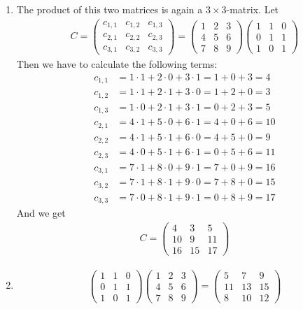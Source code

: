 \documentclass[solution]{tudexercise}
\begin{document}
\begin{enumerate}
				\item
				The product of this two matrices is again a $3 \times 3$-matrix. Let
				\begin{align*}
C = \begin{pmatrix}
c_{1, 1} & c_{1, 2} & c_{1, 3}\\
c_{2, 1} & c_{2, 2} & c_{2, 3}\\
c_{3, 1} & c_{3, 2} & c_{3, 3}
\end{pmatrix} = \begin{pmatrix}
1 & 2 & 3\\
4 & 5 & 6\\
7 & 8 & 9
\end{pmatrix}\begin{pmatrix}
1 & 1 & 0\\
0 & 1 & 1\\
1 & 0 & 1
\end{pmatrix}
				\end{align*}
				Then we have to calculate the following terms:
				\begin{align*}
c_{1, 1} &= 1 \cdot 1 + 2 \cdot 0 + 3 \cdot 1 = 1 + 0 + 3 = 4\\
c_{1, 2} &= 1 \cdot 1 + 2 \cdot 1 + 3 \cdot 0 = 1 + 2 + 0 = 3\\
c_{1, 3} &= 1 \cdot 0 + 2 \cdot 1 + 3 \cdot 1 = 0 + 2 + 3 = 5\\
c_{2, 1} &= 4 \cdot 1 + 5 \cdot 0 + 6 \cdot 1 = 4 + 0 + 6 = 10\\
c_{2, 2} &= 4 \cdot 1 + 5 \cdot 1 + 6 \cdot 0 = 4 + 5 + 0 = 9\\
c_{2, 3} &= 4 \cdot 0 + 5 \cdot 1 + 6 \cdot 1 = 0 + 5 + 6 = 11\\
c_{3, 1} &= 7 \cdot 1 + 8 \cdot 0 + 9 \cdot 1 = 7 + 0 + 9 = 16\\
c_{3, 2} &= 7 \cdot 1 + 8 \cdot 1 + 9 \cdot 0 = 7 + 8 + 0 = 15\\
c_{3, 3} &= 7 \cdot 0 + 8 \cdot 1 + 9 \cdot 1 = 0 + 8 + 9 = 17
				\end{align*}
				And we get
				\begin{align*}
C = \begin{pmatrix}
4 & 3 & 5\\
10 & 9 & 11\\
16 & 15 & 17
\end{pmatrix}
				\end{align*}
				
				\item
				\begin{align*}
\begin{pmatrix}
1 & 1 & 0\\
0 & 1 & 1\\
1 & 0 & 1
\end{pmatrix}\begin{pmatrix}
1 & 2 & 3\\
4 & 5 & 6\\
7 & 8 & 9
\end{pmatrix} = \begin{pmatrix}
5 & 7 & 9\\
11 & 13 & 15\\
8 & 10 & 12
\end{pmatrix}
				\end{align*}
				

\end{enumerate}
\end{document}
